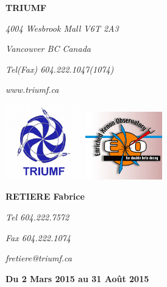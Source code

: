 \documentclass[a4paper, 12pt]{report}
\begin{document}
\vfill
\small
\begin{minipage}{0.45\linewidth}
\begin{flushleft}    
    \textbf{TRIUMF}\\
    \vspace{0.1cm}    
    {\itshape 4004 Wesbrook Mall V6T 2A3 \par}
    {\itshape Vancouver BC Canada \par}
    {\itshape Tel(Fax) 604.222.1047(1074) \par}
    {\itshape www.triumf.ca \par}
    \vspace{0.1cm}
    \footnotesize
    \includegraphics[width=0.25\textwidth]{../Pictures/triumf.png}
    \hspace{0.9cm}
    \includegraphics[width=0.25\textwidth]{../Pictures/Exo.jpeg} 
\end{flushleft}
\end{minipage}
\begin{minipage}{0.45\linewidth}
\begin{flushright}    
    {\textbf{RETIERE Fabrice} \par}
    {\itshape Tel 604.222.7572 \par}
    {\itshape Fax 604.222.1074 \par}
    {\itshape fretiere@triumf.ca \par} %
    \vspace{0.5cm}
    \footnotesize
    {\textbf{Du 2 Mars 2015 au 31 Ao\^ut 2015}}
\end{flushright}
\end{minipage}

\end{document}
